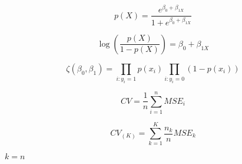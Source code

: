 \documentclass[10pt]{book}
\begin{document}
\begin{mdSnippets}
\begin{mdDisplaySnippet}[fa844e2e7d8c97568d2d0301d5147257]%
\[%
p(X)=\frac{e^{\beta_0+\beta_{1X}}}{1+e^{\beta_0+\beta_{1X}}}
\]%
\end{mdDisplaySnippet}%
\begin{mdDisplaySnippet}%
\[%
\log(\frac{p(X)}{1-p(X)}) = \beta_0+\beta_{1X}
\]%
\end{mdDisplaySnippet}%
\begin{mdDisplaySnippet}[3434640df0abf3c9138498896d5d4bb3]%
\[%
  \zeta(\beta_0,\beta_1)= \prod_{i:y_i=1}p(x_i)\prod_{i:y_i=0}(1-p(x_i))
\]%
\end{mdDisplaySnippet}%
\begin{mdDisplaySnippet}%
\[%
  CV=\frac{1}{n}\sum_{i=1}^{n}MSE_i
\]%
\end{mdDisplaySnippet}%
\begin{mdDisplaySnippet}[9ad5431ed4f79d040b8d2e68eb912e33]%
\[%
CV_{(K)}=\sum_{k=1}^{K}\frac{n_k}{n}MSE_k
\]%
\end{mdDisplaySnippet}%
\begin{mdInlineSnippet}[0a4b018f4a1382228c85c71a987d566f]%
$k=n$\end{mdInlineSnippet}%

\end{mdSnippets}
\end{document}
